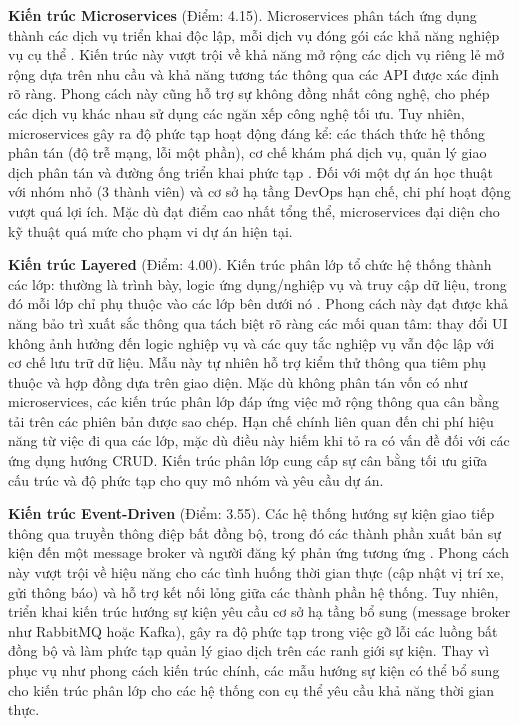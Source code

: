 \textbf{Kiến trúc Microservices} (Điểm: 4.15). Microservices phân tách ứng dụng thành các dịch vụ triển khai độc lập, mỗi dịch vụ đóng gói các khả năng nghiệp vụ cụ thể \cite{newman2021}. Kiến trúc này vượt trội về khả năng mở rộng các dịch vụ riêng lẻ mở rộng dựa trên nhu cầu và khả năng tương tác thông qua các API được xác định rõ ràng. Phong cách này cũng hỗ trợ sự không đồng nhất công nghệ, cho phép các dịch vụ khác nhau sử dụng các ngăn xếp công nghệ tối ưu. Tuy nhiên, microservices gây ra độ phức tạp hoạt động đáng kể: các thách thức hệ thống phân tán (độ trễ mạng, lỗi một phần), cơ chế khám phá dịch vụ, quản lý giao dịch phân tán và đường ống triển khai phức tạp \cite{richards2020}. Đối với một dự án học thuật với nhóm nhỏ (3 thành viên) và cơ sở hạ tầng DevOps hạn chế, chi phí hoạt động vượt quá lợi ích. Mặc dù đạt điểm cao nhất tổng thể, microservices đại diện cho kỹ thuật quá mức cho phạm vi dự án hiện tại.

\textbf{Kiến trúc Layered} (Điểm: 4.00). Kiến trúc phân lớp tổ chức hệ thống thành các lớp: thường là trình bày, logic ứng dụng/nghiệp vụ và truy cập dữ liệu, trong đó mỗi lớp chỉ phụ thuộc vào các lớp bên dưới nó \cite{bass2021}. Phong cách này đạt được khả năng bảo trì xuất sắc thông qua tách biệt rõ ràng các mối quan tâm: thay đổi UI không ảnh hưởng đến logic nghiệp vụ và các quy tắc nghiệp vụ vẫn độc lập với cơ chế lưu trữ dữ liệu. Mẫu này tự nhiên hỗ trợ kiểm thử thông qua tiêm phụ thuộc và hợp đồng dựa trên giao diện. Mặc dù không phân tán vốn có như microservices, các kiến trúc phân lớp đáp ứng việc mở rộng thông qua cân bằng tải trên các phiên bản được sao chép. Hạn chế chính liên quan đến chi phí hiệu năng từ việc đi qua các lớp, mặc dù điều này hiếm khi tỏ ra có vấn đề đối với các ứng dụng hướng CRUD. Kiến trúc phân lớp cung cấp sự cân bằng tối ưu giữa cấu trúc và độ phức tạp cho quy mô nhóm và yêu cầu dự án.

\textbf{Kiến trúc Event-Driven} (Điểm: 3.55). Các hệ thống hướng sự kiện giao tiếp thông qua truyền thông điệp bất đồng bộ, trong đó các thành phần xuất bản sự kiện đến một message broker và người đăng ký phản ứng tương ứng \cite{richards2020}. Phong cách này vượt trội về hiệu năng cho các tình huống thời gian thực (cập nhật vị trí xe, gửi thông báo) và hỗ trợ kết nối lỏng giữa các thành phần hệ thống. Tuy nhiên, triển khai kiến trúc hướng sự kiện yêu cầu cơ sở hạ tầng bổ sung (message broker như RabbitMQ hoặc Kafka), gây ra độ phức tạp trong việc gỡ lỗi các luồng bất đồng bộ và làm phức tạp quản lý giao dịch trên các ranh giới sự kiện. Thay vì phục vụ như phong cách kiến trúc chính, các mẫu hướng sự kiện có thể bổ sung cho kiến trúc phân lớp cho các hệ thống con cụ thể yêu cầu khả năng thời gian thực.

